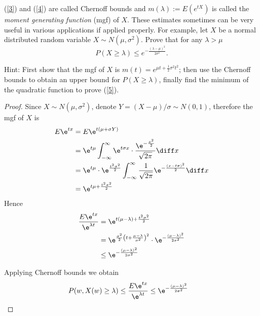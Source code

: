 \problem
\begin{question}
    (\ref{3}) and (\ref{4}) are called Chernoff bounds
    and $m(\lambda):=E(e^{t X})$ is called the \emph{moment generating function}
    (mgf) of $X$.  These estimates sometimes can be very useful in various
    applications if applied properly.  For example, let $X$ be a normal distributed
    random variable $X\sim N(\mu,\sigma^2)$.  Prove that for any $\lambda>\mu$
    \begin{equation}\label{5}
    P(X\geq \lambda)\leq e^{-\frac{(\lambda-\mu)^2}{2\sigma^2}}.
    \end{equation}

    Hint: First show that the mgf of $X$ is $m(t)=e^{\mu t+\frac{1}{2}\sigma^2t^2}$;
    then use the Chernoff bounds to obtain an upper bound for $P(X\geq \lambda)$,
    finally find the minimum of the quadratic function to prove (\ref{5}).
\end{question}

    \begin{proof}
        Since $X\sim N(\mu,\sigma^2)$,
        denote $Y=(X-\mu)/\sigma\sim N(0,1)$, therefore
        the mgf of $X$ is
        \begin{align*}
            E\e^{tx}&=E\e^{t(\mu+\sigma Y)}\\
                    &=\e^{t\mu}\int_{-\infty}^\infty\e^{t\sigma x}
                      \cdot\frac{\e^{-\frac{x^2}2}}{\sqrt{2\pi}}\diff x\\
                    &=\e^{t\mu}\cdot\e^{\frac{t^2\sigma^2}{2}}\int_{-\infty}^{\infty}
                      \frac{1}{\sqrt{2\pi}}\e^{-\frac{(x-t\sigma)^2}{2}}
                      \diff x\\
                    &=\e^{t\mu+\frac{t^2\sigma^2}{2}}
        \end{align*}
        Hence
        \begin{align*}
            \frac{E\e^{tx}}{\e^{\lambda t}}&=\e^{t(\mu-\lambda)+\frac{t^2\sigma^2}{2}}\\
            &=\e^{\frac{\sigma^2}{2}\left(t+\frac{\mu-\lambda}{\sigma^2}\right)^2}
              \cdot\e^{-\frac{(\mu-\lambda)^2}{2\sigma^2}}\\
            &\leq\e^{-\frac{(\mu-\lambda)^2}{2\sigma^2}}
        \end{align*}

        Applying Chernoff bounds we obtain
        \begin{align*}
            P(w,X(w)\geq\lambda)&\leq\frac{E\e^{tx}}{\e^{\lambda t}}
            \leq\e^{-\frac{(\mu-\lambda)^2}{2\sigma^2}}
        \end{align*}
    \end{proof}

